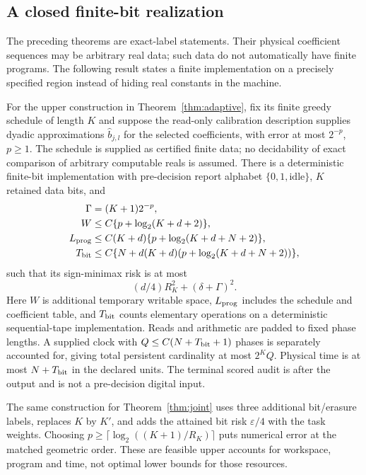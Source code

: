 \subsection{A closed finite-bit realization}
The preceding theorems are exact-label statements. Their physical coefficient sequences may be arbitrary real data; such data do not automatically have finite programs. The following result states a finite implementation on a precisely specified region instead of hiding real constants in the machine.

\begin{theorem}\label{thm:digital}
For the upper construction in Theorem~\ref{thm:adaptive}, fix its finite greedy schedule of length $K$ and suppose the read-only calibration description supplies dyadic approximations $\widehat b_{j,l}$ for the selected coefficients, with error at most $2^{-p}$, $p\ge1$. The schedule is supplied as certified finite data; no decidability of exact comparison of arbitrary computable reals is assumed. There is a deterministic finite-bit implementation with pre-decision report alphabet $\{0,1,\mathrm{idle}\}$, $K$ retained data bits, and
\begin{align}
 \Gamma&=(K+1)2^{-p},\label{eq:digitalerror}\\
 W&\le C\{p+\log_2(K+d+2)\},\label{eq:workspace}\\
 L_{\rm prog}&\le C(K+d)\{p+\log_2(K+d+N+2)\},\label{eq:program}\\
 T_{\rm bit}&\le C\{N+d(K+d)(p+\log_2(K+d+N+2))\},\label{eq:runtime}
\end{align}
such that its sign-minimax risk is at most
\begin{equation}\label{eq:digitalrisk}
 (d/4)R_K^2+(\delta+\Gamma)^2.
\end{equation}
Here $W$ is additional temporary writable space, $L_{\rm prog}$ includes the schedule and coefficient table, and $T_{\rm bit}$ counts elementary operations on a deterministic sequential-tape implementation. Reads and arithmetic are padded to fixed phase lengths. A supplied clock with $Q\le C(N+T_{\rm bit}+1)$ phases is separately accounted for, giving total persistent cardinality at most $2^KQ$. Physical time is at most $N+T_{\rm bit}$ in the declared units. The terminal scored audit is after the output and is not a pre-decision digital input.

The same construction for Theorem~\ref{thm:joint} uses three additional bit/erasure labels, replaces $K$ by $K'$, and adds the attained bit risk $\varepsilon/4$ with the task weights. Choosing $p\ge\lceil\log_2((K+1)/R_K)\rceil$ puts numerical error at the matched geometric order. These are feasible upper accounts for workspace, program and time, not optimal lower bounds for those resources.
\end{theorem}
